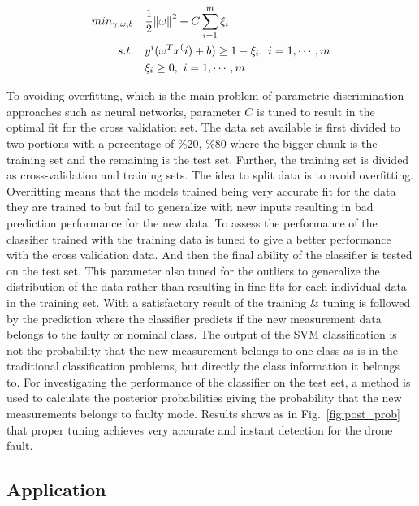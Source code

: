 \begin{align}
min_{\gamma,\omega,b} \quad & \frac{1}{2} \norm{\omega}^2 + C \sum\limits_{i = 1}^m \xi_i \\
s.t. \quad & y^{i}(\omega^T x^(i) + b) \geq 1 - \xi_i, \ i = 1, \cdots, m\\
 & \xi_i \geq 0, \ i = 1, \cdots, m
\end{align}

To avoiding overfitting, which is the main problem of parametric discrimination approaches such as neural networks, parameter $C$ is tuned to result in the optimal fit for the cross validation set. The data set available is first divided to two portions with a percentage of \%20, \%80 where the bigger chunk is the training set and the remaining is the test set. Further, the training set is divided as cross-validation and training sets. The idea to split data is to avoid overfitting. Overfitting means that the models trained being very accurate fit for the data they are trained to but fail to generalize with new inputs resulting in bad prediction performance for the new data. To assess the performance of the classifier trained with the training data is tuned to give a better performance with the cross validation data. And then the final ability of the classifier is tested on the test set. This parameter also tuned for the outliers to generalize the distribution of the data rather than resulting in fine fits for each individual data in the training set. 
With a satisfactory result of the training \& tuning is followed by the prediction where the classifier predicts if the new measurement data belongs to the faulty or nominal class. The output of the SVM classification is not the probability that the new measurement belongs to one class as is in the traditional classification problems, but directly the class information it belongs to. For investigating the performance of the classifier on the test set, a method \cite{platt1999probabilistic} is used to calculate the posterior probabilities giving the probability that the new measurements belongs to faulty mode. Results shows as in  Fig.~\ref{fig:post_prob} that proper tuning achieves very accurate and instant detection for the drone fault.
 
\subsection{Application}

